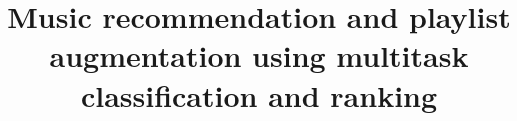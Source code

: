 \documentclass[sigconf]{acmart}
\begin{document}
\title{Music recommendation and playlist augmentation using multitask classification and ranking}



%
%


\maketitle

\begin{abstract}

\end{abstract}

%













\clearpage
\newpage
\onecolumn
\appendix






%
\end{document}
